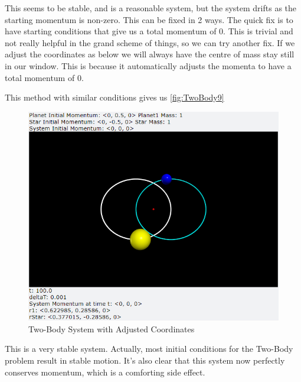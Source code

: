 \documentclass[12pt]{article}
\begin{document}
\begin{enumerate}
        \newline
        This seems to be stable, and is a reasonable system, but the system drifts as the starting momentum 
        is non-zero. This can be fixed in 2 ways. The quick fix is to have starting conditions that give us 
        a total momentum of 0. This is trivial and not really helpful in the grand scheme of things, so we 
        can try another fix. If we adjust the coordinates as below we will always have the centre of mass 
        stay still in our window. This is because it automatically adjusts the momenta to have a total 
        momentum of 0.
        
        This method with similar conditions gives us \autoref{fig:TwoBody9}
        \begin{figure}[H]
            \begin{center}
               \includegraphics[scale=.5]{TwoBody9.png}
               \caption{Two-Body System with Adjusted Coordinates}
               \label{fig:TwoBody9}
            \end{center}
        \end{figure}
        \noindent
        This is a very stable system. Actually, most initial conditions for the Two-Body problem result in 
        stable motion. It's also clear that this system now perfectly conserves momentum, which 
        is a comforting side effect.
        \newpage


\end{enumerate}
\end{document}
